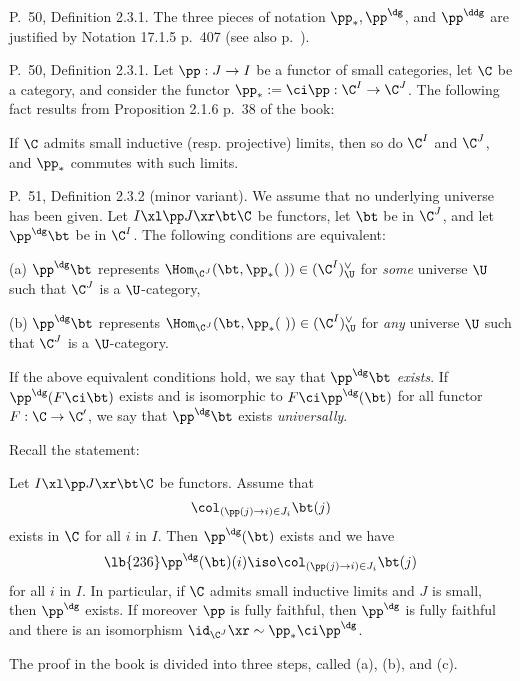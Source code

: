 \documentclass[12pt]{article}
\theoremstyle{remark}
\theoremstyle{definition}
\begin{document}
%

\begin{s}
P.~50, Definition 2.3.1. The three pieces of notation $\pp_*,\pp^\dg$, and $\pp^\ddg$ are justified by Notation 17.1.5 p.~407 (see also  p.~). 
\end{s} 

% 

\begin{s}
P.~50, Definition 2.3.1. Let $\pp:J\to I$ be a functor of small categories, let $\C$ be a category, and consider the functor $\pp_*:=\ci\pp:\C^I\to\C^J$. The following fact results from Proposition 2.1.6 p.~38 of the book: 

If $\C$ admits small inductive (resp. projective) limits, then so do $\C^I$ and $\C^J$, and $\pp_*$ commutes with such limits. 
\end{s} 

%

\begin{s} 
P.~51, Definition 2.3.2 (minor variant). We assume that no underlying universe has been given. Let $I\xl\pp J\xr\bt\C$ be functors, let $\bt$ be in $\C^J$, and let $\pp^\dg\bt$ be in $\C^I$. The following conditions are equivalent:

\nn(a) $\pp^\dg\bt$ represents $\Hom_{\C^J}(\bt,\pp_*(\ ))\in(\C^I)^\vee_\U$ for \emph{some} universe $\U$ such that $\C^J$ is a $\U$-category,

\nn(b) $\pp^\dg\bt$ represents $\Hom_{\C^J}(\bt,\pp_*(\ ))\in(\C^I)^\vee_\U$ for \emph{any} universe $\U$ such that $\C^J$ is a $\U$-category. 

\begin{df}[Definition 2.3.2 p. 51] 
If the above equivalent conditions hold, we say that $\pp^\dg\bt$ {\em exists}. If $\pp^\dg(F\ci\bt)$ exists and is isomorphic to $F\ci\pp^\dg(\bt)$ for all functor $F:\C\to\C'$, we say that $\pp^\dg\bt$ exists {\em universally}.
\end{df}
\end{s}



Recall the statement: 

\begin{thm}[Theorem 2.3.3 (i) p.~52]
Let $I\xl\pp J\xr\bt\C$ be functors. Assume that 
$$
\col_{(\pp(j)\to i)\in J_i}\bt(j)
$$ 
exists in $\C$ for all $i$ in $I$. Then $\pp^\dg(\bt)$ exists and we have 
%
\begin{equation}\lb{236}
\pp^\dg(\bt)(i)\iso\col_{(\pp(j)\to i)\in J_i}\bt(j)
\end{equation} 
%
for all $i$ in $I$. In particular, if $\C$ admits small inductive limits and $J$ is small, then $\pp^\dg$ exists. If moreover $\pp$ is fully faithful, then $\pp^\dg$ is fully faithful and there is an isomorphism $\id_{\C^J}\xr\sim\pp_*\ci\pp^\dg$. 
\end{thm}
The proof in the book is divided into three steps, called (a), (b), and (c). 
\end{document}
